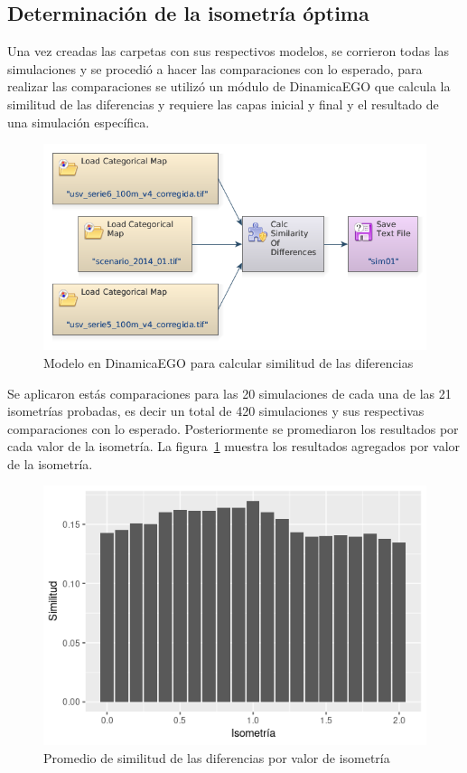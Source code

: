 \documentclass[12pt,a4paper,oldfontcommands]{article}
\begin{document}
\subsection{Determinación de la isometría óptima}
Una vez creadas las carpetas con sus respectivos modelos, se corrieron todas las simulaciones y se procedió a hacer las comparaciones con lo esperado, para realizar las comparaciones se utilizó un módulo de DinamicaEGO que calcula la similitud de las diferencias y requiere las capas inicial y final y el resultado de una simulación específica.
\begin{figure}[h]
	\centering
	\includegraphics[width=1\textwidth]{./figuras/similitud.png}
	\caption{Modelo en DinamicaEGO para calcular similitud de las diferencias}
\end{figure}
\bigskip
Se aplicaron estás comparaciones para las 20 simulaciones de cada una de las 21 isometrías probadas, es decir un total de 420 simulaciones y sus respectivas comparaciones con lo esperado. Posteriormente se promediaron los resultados por cada valor de la isometría. La figura~\ref{fig:isometria} muestra los resultados agregados por valor de la isometría.
\begin{figure}[h]
	\centering
	\includegraphics[width=1\textwidth]{./figuras/similitud_isometria.png}
	\caption{Promedio de similitud de las diferencias por valor de isometría}
	\label{fig:isometria}
\end{figure}
\bigskip
\end{document}

